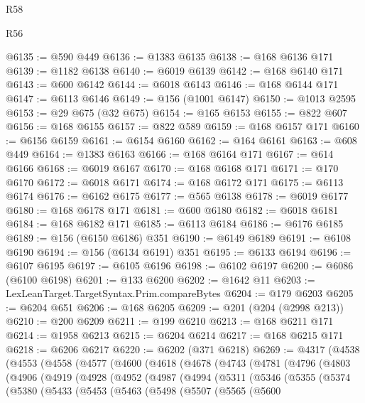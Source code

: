 \begin{lexlean}{R58}
\begin{lexlean}{R56}
\begin{coremodule}
{{{{{{{{{{{{{{{{{{{{{{{{{{{{{{{{{{{{{{{{{{{{{{{{{{{{{{{{{{{{{{{{{{{{{{{{{{{{{{{{{{{{{{{{{{{{{{{{{{{{{{{{{{{{{{{{{{{{{{{{{{{{{{{{{{{{{{{{{{{{{{{{{{{{{{{{{{{{{{{{{{{{{{{{{{{{{{{{{{{{{{{{{{{{{{{{{{{{{{{{{{{{{{{{{{{@6135 := @590 @449
@6136 := @1383 @6135
@6138 := @168 @6136 @171
@6139 := @1182 @6138
@6140 := @6019 @6139
@6142 := @168 @6140 @171
@6143 := @600 @6142
@6144 := @6018 @6143
@6146 := @168 @6144 @171
@6147 := @6113 @6146
@6149 := @156 (@1001 @6147)
@6150 := @1013 @2595
@6153 := @29 @675 (@32 @675)
@6154 := @165 @6153
@6155 := @822 @607
@6156 := @168 @6155
@6157 := @822 @589
@6159 := @168 @6157 @171
@6160 := @6156 @6159
@6161 := @6154 @6160
@6162 := @164 @6161
@6163 := @608 @449
@6164 := @1383 @6163
@6166 := @168 @6164 @171
@6167 := @614 @6166
@6168 := @6019 @6167
@6170 := @168 @6168 @171
@6171 := @170 @6170
@6172 := @6018 @6171
@6174 := @168 @6172 @171
@6175 := @6113 @6174
@6176 := @6162 @6175
@6177 := @565 @6138
@6178 := @6019 @6177
@6180 := @168 @6178 @171
@6181 := @600 @6180
@6182 := @6018 @6181
@6184 := @168 @6182 @171
@6185 := @6113 @6184
@6186 := @6176 @6185
@6189 := @156 (@6150 @6186) @351
@6190 := @6149 @6189
@6191 := @6108 @6190
@6194 := @156 (@6134 @6191) @351
@6195 := @6133 @6194
@6196 := @6107 @6195
@6197 := @6105 @6196
@6198 := @6102 @6197
@6200 := @6086 (@6100 @6198)
@6201 := @133 @6200
@6202 := @1642 @11
@6203 := LexLeanTarget.TargetSyntax.Prim.compareBytes
@6204 := @179 @6203
@6205 := @6204 @651
@6206 := @168 @6205
@6209 := @201 (@204 (@2998 @213))
@6210 := @200 @6209
@6211 := @199 @6210
@6213 := @168 @6211 @171
@6214 := @1958 @6213
@6215 := @6204 @6214
@6217 := @168 @6215 @171
@6218 := @6206 @6217
@6220 := @6202 (@371 @6218)
@6269 := @4317
    (@4538
      (@4553
        (@4558
          (@4577
            (@4600
              (@4618
                (@4678
                  (@4743
                    (@4781
                      (@4796
                        (@4803
                          (@4906
                            (@4919
                              (@4928
                                (@4952
                                  (@4987
                                    (@4994
                                      (@5311
                                        (@5346
                                          (@5355
                                            (@5374
                                              (@5380
                                                (@5433
                                                  (@5453
                                                    (@5463
                                                      (@5498
                                                        (@5507
                                                          (@5565
                                                            (@5600
}}}}}}}}}}}}}}}}}}}}}}}}}}}}}}}}}}}}}}}}}}}}}}}}}}}}}}}}}}}}}}}}}}}}}}}}}}}}}}}}}}}}}}}}}}}}}}}}}}}}}}}}}}}}}}}}}}}}}}}}}}}}}}}}}}}}}}}}}}}}}}}}}}}}}}}}}}}}}}}}}}}}}}}}}}}}}}}}}}}}}}}}}}}}}}}}}}}}}}}}}}}}}}}}}}}
\end{coremodule}
\end{lexlean}
\end{lexlean}
